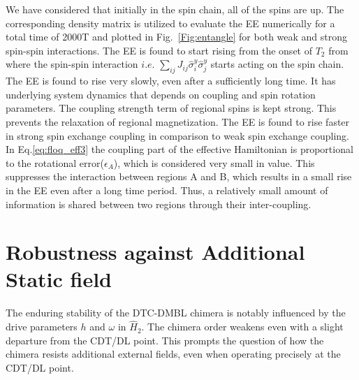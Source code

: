 \documentclass[%
nofootinbib,
reprint,
superscriptaddress,
amsmath,amssymb,showkeys,
aps,
prb,
]{revtex4-2}
\begin{document}
	We have considered that initially in the spin chain, all of the spins are up. The corresponding density matrix is utilized to evaluate the EE numerically for a total time of 2000T and  plotted in Fig.~\ref{Fig:entangle} for both weak and strong spin-spin interactions. The EE is found to start rising from the onset of $T_2$ from where the spin-spin interaction $\textit{i.e.}$  $\displaystyle \sum_{ij}J_{ij}\hat{\sigma}^y_i\hat{\sigma}^y_j$ starts acting on the spin chain. The EE is found to rise very slowly, even after a sufficiently long time. It has underlying system dynamics that depends on coupling and spin rotation parameters. The coupling strength term of regional spins is kept strong. This prevents the relaxation of regional magnetization. The EE is found to rise faster in strong spin exchange coupling in comparison to weak spin exchange coupling. In Eq.\eqref{eq:floq_eff3} the coupling part of the effective Hamiltonian is proportional to the rotational error($\epsilon_A$), which is considered very small in value. This suppresses the interaction between regions A and B, which results in a small rise in the EE even after a long time period. Thus, a relatively small amount of information is shared between two regions through their inter-coupling.
	
	\section{\label{sec:level6} Robustness against Additional Static field}
	
	
	The enduring stability of the DTC-DMBL chimera is notably influenced by the drive parameters $h$ and $\omega$ in $\hat{H}_2$. The chimera order weakens even with a slight departure from the CDT/DL point. This prompts the question of how the chimera resists additional external fields, even when operating precisely at the CDT/DL point.
	
\end{document}
